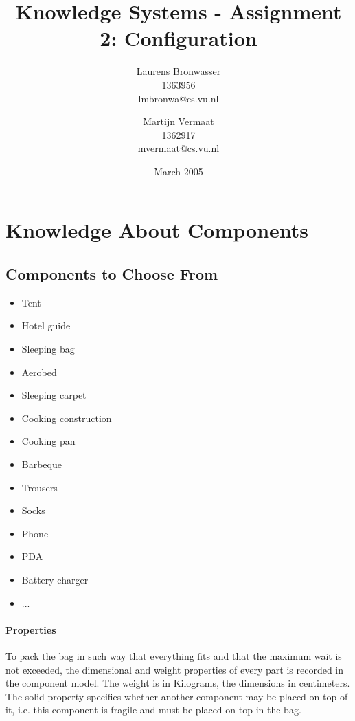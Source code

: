 \documentclass[a4paper,11pt]{article}
\title{Knowledge Systems - Assignment 2: Configuration}
\author{Laurens Bronwasser\\
1363956\\
lmbronwa@cs.vu.nl
\and
Martijn Vermaat\\
1362917\\
mvermaat@cs.vu.nl}
\date{March 2005}
\begin{document}
\maketitle




\tableofcontents


\section{Knowledge About Components}


\subsection*{Components to Choose From}

\begin{itemize}
\item Tent 
\item Hotel guide 
\item Sleeping bag 
\item Aerobed 
\item Sleeping carpet 
\item Cooking construction
\item Cooking pan
\item Barbeque
\item Trousers
\item Socks
\item Phone
\item PDA
\item Battery charger
\item ...
\end{itemize}

\paragraph{Properties}

To pack the bag in such way that everything fits and that the maximum wait is 
not exceeded, the dimensional and weight properties of every part is recorded in
the component model. The weight is in Kilograms, the dimensions in centimeters.
The solid property specifies whether another component may be placed on top of 
it, i.e. this component is fragile and must be placed on top in the bag.
\end{document}
